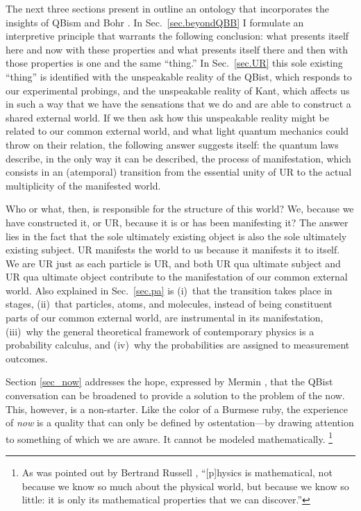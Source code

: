 \documentclass[12pt]{article}
\begin{document}
The next three sections present in outline an ontology that incorporates the insights of QBism and Bohr \cite{Mohrhoff_Manifesting,Mohrhoff_NewLight,TWATQM}. In Sec.~\ref{sec.beyondQBB} I formulate an interpretive principle that warrants the following conclusion: what presents itself here and now with these properties and what presents itself there and then with those properties is one and the same ``thing.'' In Sec.~\ref{sec.UR} this sole existing ``thing'' is identified with the unspeakable reality of the QBist, which responds to our experimental probings, and the unspeakable reality of Kant, which affects us
in such a way that we have the sensations that we do and are able to construct a shared external world. If we then ask how this unspeakable reality might be related to our common external world, and what light quantum mechanics could throw on their relation, the following answer suggests itself: the quantum laws describe, in the only way it can be described, the process of manifestation, which consists in an (atemporal) transition from the essential unity of UR to the actual {multiplicity} of the manifested world.

Who or what, then, is responsible for the structure of this world? We, because we have constructed it, or UR, because it is or has been manifesting it? The answer lies in the fact that the sole ultimately existing object is also the sole ultimately existing subject. UR manifests the world to us because it manifests it to itself. We are UR just as each particle is UR, and both UR qua ultimate subject and UR qua ultimate object contribute to the manifestation of our common external world. Also explained in Sec.~\ref{sec.pa} is (i)~that the transition takes place in stages, (ii)~that particles, atoms, and molecules, instead of being constituent parts of our common external world, are instrumental in its manifestation, (iii)~why the general theoretical framework of contemporary physics is a probability calculus, and (iv)~why the probabilities are assigned to measurement outcomes.

Section \ref{sec_now} addresses the hope, expressed by Mermin \cite{Mermin_Nature}, that the QBist conversation can be broadened to provide a solution to the problem of the now. This, however, is a non-starter. Like the color of a Burmese ruby, the experience of \emph{now} is a quality that can only be defined by {ostentation}---by drawing attention to something of which we are aware. It cannot be modeled mathematically.%
\footnote{As was pointed out by Bertrand Russell \cite{RussellOutline}, ``[p]hysics is mathematical, not because we know so much about the physical world, but because we know so little: it is only its mathematical properties that we can discover.''}
\end{document}
